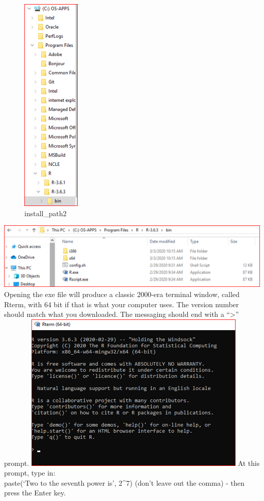 \documentclass[
]{book}
\begin{document}
\begin{figure}
\centering
\includegraphics{images/installwin-path2.png}
\caption{install\_path2}
\end{figure}

\includegraphics{images/installrpath.png}
Opening the exe file will produce a classic 2000-era terminal window, called Rterm, with 64 bit if that is what your computer uses. The version number should match what you downloaded. The messaging should end with a ``\textgreater{}'' prompt.
\includegraphics{images/windowsrterm.png}
At this prompt, type in:\\
paste(`Two to the seventh power is', 2\^{}7)
(don't leave out the comma) - then press the Enter key.
\end{document}
